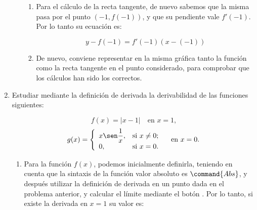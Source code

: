 \begin{enumerate}[leftmargin=*]
\begin{enumerate}
\begin{indicacion}
{\begin{enumerate}
\[
f'(a) = \mathop {\lim }\limits_{h \to 0} \frac{{f(a + h) - f(a)}}
{h}
\]
en donde, por aligerar la notación, hemos llamado $h$ a lo que en la
teoría denominábamos $\Delta x$.

Por lo tanto, para calcular la derivada de la función $f$ en $a=-1$
mediante la definición, procedemos con:

\[
f'(-1) = \mathop {\lim }\limits_{h \to 0} \frac{{f(-1 + h) - f(-1)}}
{h}
\]

Para calcular el límite, podemos utilizar el botón  de la barra de botones.

\item Para el cálculo de la recta tangente, de nuevo sabemos que
la misma pasa por el punto $(-1, f(-1))$, y que su pendiente vale
$f'(-1)$. Por lo tanto su ecuación es:

\[
y - f( - 1) = f'(-1)\left( {x - ( - 1)} \right)
\]

\item De nuevo, conviene representar en la misma gráfica tanto la
función como la recta tangente en el punto considerado, para
comprobar que los cálculos han sido los correctos.

\end{enumerate}
}
\end{indicacion}


\end{enumerate}




\item Estudiar mediante la definición de derivada la derivabilidad
de las funciones siguientes:


\[
f(x)=|x-1| \quad \textrm{en $x=1$,}
\]
\[
g(x)=\left\{%
\begin{array}{ll}
   x \sen\dfrac{1}{x}, & \hbox{si $x\neq 0$;} \\
   0, & \hbox{si $x=0$.} \\
\end{array}%
\right. \quad \textrm{en $x=0$.}
\]

\begin{indicacion}
{
\begin{enumerate}
\item Para la función $f(x)$, podemos inicialmente definirla,
teniendo en cuenta que la sintaxis de la función valor absoluto es
$\command{Abs}$, y después utilizar la definición de derivada en un
punto dada en el problema anterior, y calcular el límite mediante el
botón . Por lo tanto, si existe la
derivada en $x=1$ su valor es:



\end{enumerate}}
\end{indicacion}
\end{enumerate}
